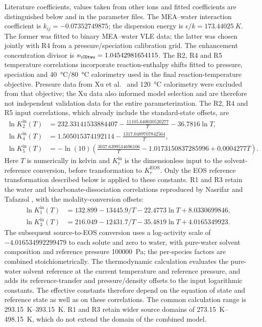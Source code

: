 Literature coefficients, values taken from other ions and fitted coefficients are distinguished below and in the parameter files.
The MEA--water interaction coefficient is $k_{ij}=-0.07352749875$; the \COtwo{} dispersion energy is $\epsilon/k=\qty{173.44025}{K}$.
The former was fitted to binary MEA--water VLE data; the latter was chosen jointly with R4 from a pressure/speciation calibration grid.
The enhancement concentration divisor is $s_{\COtwo}=1.04542981654115$.
The R2, R4 and R5 temperature correlations incorporate reaction-enthalpy shifts fitted to pressure, speciation and \qty{40}{\degreeCelsius}/\qty{80}{\degreeCelsius} calorimetry used in the final reaction-temperature objective.
Pressure data from Xu et al.\ \cite{Xu2011} and \qty{120}{\degreeCelsius} calorimetry were excluded from that objective; the Xu data also informed model selection and are therefore not independent validation data for the entire parameterization.
The R2, R4 and R5 input correlations, which already include the standard-state offsets, are
\begin{align}
\ln K^{\mathrm{in}}_2(T)&=232.33141533884407-\frac{11105.640030520277}{T}-36.7816\ln T,\\
\ln K^{\mathrm{in}}_4(T)&=1.505015374192114-\frac{1317.0489707842564}{T},\\
\ln K^{\mathrm{in}}_5(T)&=-\ln(10)\left(\frac{3037.6399534696106}{T}-1.0173150837285996+0.0004277T\right).
\end{align}
Here \(T\) is numerically in kelvin and \(K_r^{\mathrm{in}}\) is the dimensionless input to the solvent-reference conversion, before transformation to \(K_r^{\mathrm{EOS}}\).
Only the EOS reference transformation described below is applied to these constants.
R1 and R3 retain the water and bicarbonate-dissociation correlations reproduced by Nasrifar and Tafazzol \cite{Nasrifar2010}, with the molality-conversion offsets:
\begin{align}
\ln K^{\mathrm{in}}_1(T)&=132.899-13445.9/T-22.4773\ln T+8.0330699846,\\
\ln K^{\mathrm{in}}_3(T)&=216.049-12431.7/T-35.4819\ln T+4.0165349923.
\end{align}
The subsequent source-to-EOS conversion uses a log-activity scale of $-4.016534992299479$ to each solute and zero to water, with pure-water solvent composition and reference pressure \qty{100000}{Pa}; the per-species factors are combined stoichiometrically.
The thermodynamic calculation evaluates the pure-water solvent reference at the current temperature and reference pressure, and adds its reference-transfer and pressure/density offsets to the input logarithmic constants.
The effective constants therefore depend on the equation of state and reference state as well as on these correlations.
The common calculation range is \qtyrange{293.15}{393.15}{K}.
R1 and R3 retain wider source domains of \qtyrange{273.15}{498.15}{K}, which do not extend the domain of the combined model.

\clearpage
\begingroup
\makeatletter
\setlength{\@fptop}{0pt}
\makeatother

\clearpage
\endgroup
